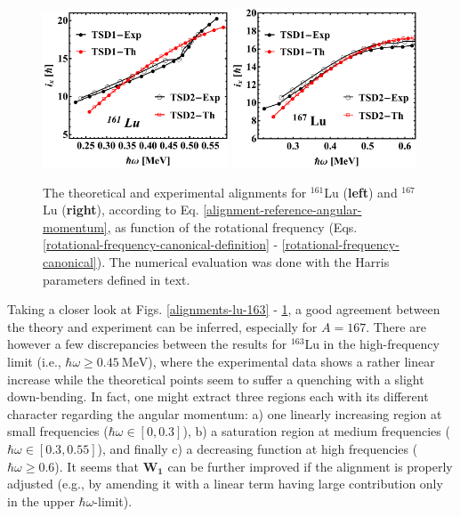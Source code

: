 \begin{figure}
    \centering
    \includegraphics[width=0.49\textwidth]{Chapters/Figures/Lu-exp-energies/fig7.pdf}
    \includegraphics[width=0.49\textwidth]{Chapters/Figures/Lu-exp-energies/fig10.pdf}
    \caption{The theoretical and experimental alignments for $^{161}$Lu (\textbf{left}) and $^{167}$Lu (\textbf{right}), according to Eq. \ref{alignment-reference-angular-momentum}, as function of the rotational frequency (Eqs. \ref{rotational-frequency-canonical-definition} - \ref{rotational-frequency-canonical}). The numerical evaluation was done with the Harris parameters defined in text.}
    \label{alignments-lu-161-167}
\end{figure}

Taking a closer look at Figs. \ref{alignments-lu-163} - \ref{alignments-lu-161-167}, a good agreement between the theory and experiment can be inferred, especially for $A=167$. There are however a few discrepancies between the results for $^{163}$Lu in the high-frequency limit (i.e., $\hbar\omega\geq 0.45\ \text{MeV}$), where the experimental data shows a rather linear increase while the theoretical points seem to suffer a quenching with a slight down-bending. In fact, one might extract three regions each with its different character regarding the angular momentum: a) one linearly increasing region at small frequencies ($\hbar\omega\in[0,0.3]$), b) a saturation region at medium frequencies ($\hbar\omega\in[0.3,0.55]$), and finally c) a decreasing function at high frequencies ($\hbar\omega\geq 0.6$). It seems that $\mathbf{W_1}$ can be further improved if the alignment is properly adjusted (e.g., by amending it with a linear term having large contribution only in the upper $\hbar\omega$-limit).

